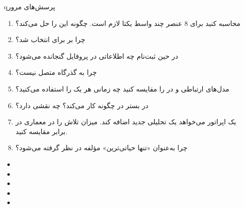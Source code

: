 
\begin{CNbox}[unbreakable]{q}{پرسش‌های مرور}

\begin{enumerate}
\def\labelenumi{\arabic{enumi}.}
\tightlist
\item
  محاسبه کنید برای 8 عنصر  چند واسط یکتا لازم است.  چگونه این را حل می‌کند؟
\item
  چرا  بر  برای  انتخاب شد؟
\item
  در حین ثبت‌نام  چه اطلاعاتی در پروفایل  گنجانده می‌شود؟
\item
  چرا  به گذرگاه  متصل نیست؟
\item
  مدل‌های ارتباطی  و  در  را مقایسه کنید  چه زمانی هر یک را استفاده می‌کنید؟
\item
   در بستر  در  چگونه کار می‌کند؟  چه نقشی دارد؟
\item
  یک اپراتور می‌خواهد یک  تحلیلی جدید  اضافه کند. میزان تلاش را در معماری  در برابر  مقایسه کنید.
\item
  چرا  به‌عنوان «تنها حیاتی‌ترین» مؤلفه  در نظر گرفته می‌شود؟
\end{enumerate}

\end{CNbox}


\begin{itemize}
\tightlist
\item
\item
\item
\item
\item
\end{itemize}
